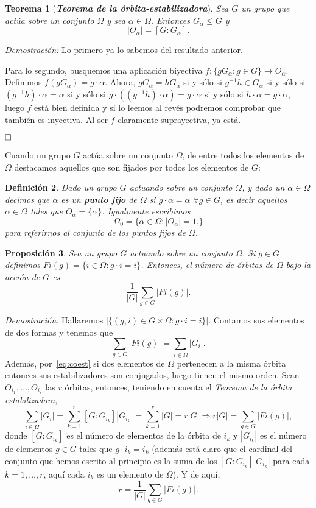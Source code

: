 \documentclass[12pt]{article}
\newtheorem{theorem}{Teorema}[section]
\newtheorem{proposition}[theorem]{Proposición}
\newtheorem{definition}[theorem]{Definición}
\begin{document}
\begin{theorem}[\textbf{\textit{Teorema de la órbita-estabilizadora}}] \label{eq:torest}
Sea $G$ un grupo que actúa sobre un conjunto $\Omega$ y sea $\alpha \in \Omega$. Entonces $G_\alpha \leq G$ y $$|O_\alpha| = [G:G_\alpha].$$
\end{theorem}
\emph{Demostración: }Lo primero ya lo sabemos del resultado anterior.

Para lo segundo, busquemos una aplicación biyectiva $f \colon \lbrace gG_\alpha : g \in G \rbrace \longrightarrow O_\alpha$. Definimos $f(gG_\alpha) = g\cdot \alpha$. Ahora, $gG_\alpha = h G_\alpha$ si y sólo si $g^{-1}h \in G_\alpha$ si y sólo si $(g^{-1}h) \cdot \alpha = \alpha$ si y sólo si $g \cdot ((g^{-1}h) \cdot \alpha) = g \cdot \alpha$ si y sólo si $h \cdot \alpha = g \cdot \alpha$, luego $f$ está bien definida y si lo leemos al revés podremos comprobar que también es inyectiva. Al ser $f$ claramente suprayectiva, ya está.

$\hfill \square$

Cuando un grupo $G$ actúa sobre un conjunto $\Omega$, de entre todos los elementos de $\Omega$ destacamos aquellos que son fijados por todos los elementos de $G$:

\begin{definition}Dado un grupo $G$ actuando sobre un conjunto $\Omega$, y dado un $\alpha \in \Omega$ decimos que $\alpha$ es un \textbf{punto fijo} de $\Omega$ si $g \cdot \alpha = \alpha$ $\forall g \in G$, es decir aquellos $\alpha \in \Omega$ tales que $O_\alpha = \lbrace \alpha \rbrace$. Igualmente escribimos $$\Omega_0 = \lbrace \alpha \in \Omega : |O_\alpha | = 1. \rbrace$$ para referirnos al conjunto de los puntos fijos de $\Omega$.
\end{definition}

\begin{proposition}Sea un grupo $G$ actuando sobre un conjunto $\Omega$. Si $g \in G$, definimos $Fi(g) = \lbrace i \in \Omega: g \cdot i = i \rbrace$. Entonces, el número de órbitas de $\Omega$ bajo la acción de $G$ es $$\dfrac{1}{|G|} \sum_{g \in G} |Fi(g)|.$$
\end{proposition}
\emph{Demostración: }Hallaremos $|\lbrace (g,i) \in G \times \Omega : g \cdot i = i\rbrace |$. Contamos sus elementos de dos formas y tenemos que $$\sum_{g\in G} |Fi(g)| = \sum_{i\in \Omega}|G_i|.$$ Además, por~\ref{eq:coest} si dos elementos de $\Omega$ pertenecen a la misma órbita entonces sus estabilizadores son conjugados, luego tienen el mismo orden. Sean $O_{i_1}, \ldots, O_{i_r}$ las $r$ órbitas, entonces, teniendo en cuenta el \textit{Teorema de la órbita estabilizadora}, $$\sum_{i\in \Omega} |G_i| = \sum_{k=1}^r[G:G_{i_k}]|G_{i_k}| = \sum_{k=1}^r|G| = r|G|\Rightarrow r|G| = \sum_{g\in G} |Fi(g)|,$$ donde $[G:G_{i_k}]$ es el número de elementos de la órbita de $i_k$ y $|G_{i_k}|$ es el número de elementos $g\in G$ tales que $g\cdot i_k = i_k$ (además está claro que el cardinal del conjunto que hemos escrito al principio es la suma de los $[G:G_{i_k}]|G_{i_k}|$ para cada $k=1,\ldots, r$, aquí cada $i_k$ es un elemento de $\Omega$). Y de aquí, $$r = \dfrac{1}{|G|}\sum_{g\in G} |Fi(g)|.$$
\end{document}
